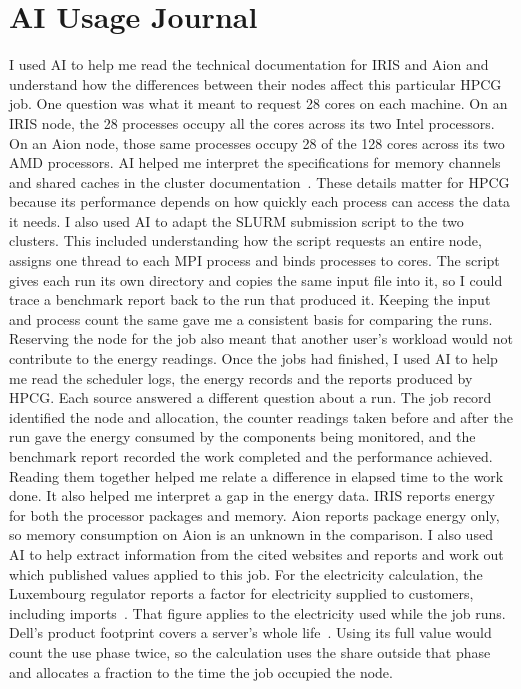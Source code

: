 \documentclass[conference,a4paper]{IEEEtran}
\begin{document}
\twocolumn
\section{AI Usage Journal}\label{app:journal}

I used AI to help me read the technical documentation for IRIS and Aion and
understand how the differences between their nodes affect this particular HPCG
job. One question was what it meant to request 28 cores on each machine. On an
IRIS node, the 28 processes occupy all the cores across its two Intel processors.
On an Aion node, those same processes occupy 28 of the 128 cores across its two
AMD processors. AI helped me interpret the specifications for memory channels
and shared caches in the cluster documentation~\cite{ulhpc-iris,ulhpc-aion}.
These details matter for HPCG because its
performance depends on how quickly each process can access the data it needs.
I also used AI to adapt the SLURM submission script to the two clusters. This
included understanding how the script requests an entire node, assigns one
thread to each MPI process and binds processes to cores. The script gives
each run its own directory and copies the same input file into it, so I could
trace a benchmark report back to the run that produced it. Keeping the input and
process count the same gave me a consistent basis for comparing the runs.
Reserving the node for the job also meant that another user's workload would
not contribute to the energy readings. Once the jobs had finished, I used AI
to help me read the scheduler logs, the energy records and the reports produced
by HPCG. Each source answered a different question about a run. The job record
identified the node and allocation, the counter readings taken before and after
the run gave the energy consumed by the components being monitored, and the
benchmark report recorded the work completed and the performance achieved.
Reading them together helped me relate a difference in elapsed time to the
work done. It also helped me interpret a gap in the energy data. IRIS reports
energy for both the processor packages and memory. Aion reports package energy
only, so memory consumption on Aion is an unknown in the comparison. I also
used AI to help extract information from the cited websites and reports and
work out which published values applied to this job. For the electricity
calculation, the Luxembourg regulator reports a factor for electricity supplied
to customers, including imports~\cite{ilr2026}. That figure applies to the
electricity used while the job runs. Dell's product footprint covers a server's
whole life~\cite{dell-c6420-pcf}. Using its full value would count the use phase twice, so the
calculation uses the share outside that phase and allocates a fraction to the
time the job occupied the node.
\end{document}
